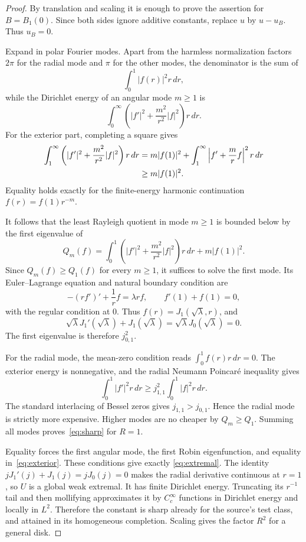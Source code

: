 \documentclass[11pt]{article}
\begin{document}
\begin{proof}
By translation and scaling it is enough to prove the assertion for
$B=B_1(0)$.  Since both sides ignore additive constants, replace $u$ by
$u-u_B$.  Thus $u_B=0$.

Expand in polar Fourier modes.  Apart from the harmless normalization factors
$2\pi$ for the radial mode and $\pi$ for the other modes, the denominator is
the sum of
\[
 \int_0^1 |f(r)|^2r\,dr,
\]
while the Dirichlet energy of an angular mode $m\ge1$ is
\[
 \int_0^\infty\left(|f'|^2+\frac{m^2}{r^2}|f|^2\right)r\,dr.
\]
For the exterior part, completing a square gives
\begin{align}\label{eq:exterior}
 \int_1^\infty\left(|f'|^2+\frac{m^2}{r^2}|f|^2\right)r\,dr
 &=m|f(1)|^2+
 \int_1^\infty\left|f'+\frac mr f\right|^2r\,dr\\
 &\ge m|f(1)|^2.\notag
\end{align}
Equality holds exactly for the finite-energy harmonic continuation
$f(r)=f(1)r^{-m}$.

It follows that the least Rayleigh quotient in mode $m\ge1$ is bounded below
by the first eigenvalue of
\begin{equation}\label{eq:mode}
 Q_m(f)=\int_0^1\left(|f'|^2+\frac{m^2}{r^2}|f|^2\right)r\,dr
 +m|f(1)|^2.
\end{equation}
Since $Q_m(f)\ge Q_1(f)$ for every $m\ge1$, it suffices to solve the first
mode.  Its Euler--Lagrange equation and natural boundary condition are
\[
 -(rf')'+\frac1r f=\lambda r f,
 \qquad f'(1)+f(1)=0,
\]
with the regular condition at $0$.  Thus $f(r)=J_1(\sqrt\lambda,r)$, and
\[
 \sqrt\lambda J_1'(\sqrt\lambda)+J_1(\sqrt\lambda)
 =\sqrt\lambda J_0(\sqrt\lambda)=0.
\]
The first eigenvalue is therefore $j_{0,1}^2$.

For the radial mode, the mean-zero condition reads
$\int_0^1 f(r)r\,dr=0$.  The exterior energy is nonnegative, and the radial
Neumann Poincar\'e inequality gives
\[
 \int_0^1|f'|^2r\,dr\ge j_{1,1}^2\int_0^1|f|^2r\,dr.
\]
The standard interlacing of Bessel zeros gives $j_{1,1}>j_{0,1}$.  Hence the
radial mode is strictly more expensive.  Higher modes are no cheaper by
$Q_m\ge Q_1$.  Summing all modes proves~\eqref{eq:sharp} for $R=1$.

Equality forces the first angular mode, the first Robin eigenfunction, and
equality in~\eqref{eq:exterior}.  These conditions give exactly
\eqref{eq:extremal}.  The identity
$jJ_1'(j)+J_1(j)=jJ_0(j)=0$ makes the radial derivative continuous at $r=1$,
so $U$ is a global weak extremal.  It has finite Dirichlet energy.  Truncating
its $r^{-1}$ tail and then mollifying approximates it by $C_c^\infty$
functions in Dirichlet energy and locally in $L^2$.  Therefore the constant is
sharp already for the source's test class, and attained in its homogeneous
completion.  Scaling gives the factor $R^2$ for a general disk.
\end{proof}
\end{document}
